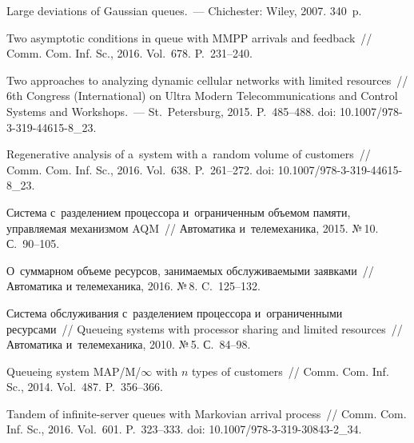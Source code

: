  \begin{multicols}{2}

\renewcommand{\bibname}{\protect\rmfamily Литература}

{\small\frenchspacing
{%
\begin{thebibliography}{99}

 Large deviations of Gaussian queues.~--- 
Chichester: Wiley, 2007. 340~p.

Two asymptotic conditions in queue with MMPP arrivals and feedback~// 
Comm. Com. Inf. Sc., 2016. Vol.~678. P.~231--240.

Two approaches to analyzing dynamic cellular networks with limited resources~//  
6th Congress (International)
on Ultra Modern Telecommunications and Control Systems and Workshops.~--- 
St.\ Petersburg, 2015. P.~485--488.
doi: 10.1007/978-3-319-44615-8\_23.

Regenerative analysis of a~system with a~random volume of customers~// 
Comm. Com. Inf. Sc., 2016. Vol.~638. P.~261--272.
doi: 10.1007/978-3-319-44615-8\_23.





Система с~разделением процессора и~ограниченным объемом памяти,
управ\-ля\-емая механизмом AQM~//
Автоматика и~телемеханика, 2015.
№\,10. С.~90--105.

О~суммарном объеме ресурсов, занимаемых обслуживаемыми заявками~// 
Автоматика и телемеханика, 2016. №\,8. C.~125--132.

Система обслуживания с~разделением процессора и~ограниченными ресурсами~//
Queueing systems with processor sharing and limited resources~// 
Автоматика и~телемеханика, 2010. №\,5. С.~84--98.

 Queueing system 
MAP/M/$\infty$ with $n$ types of customers~// 
Comm. Com. Inf. Sc., 2014. Vol.~487. P.~356--366.

Tandem of infinite-server queues with Markovian arrival process~// 
Comm. Com. Inf. Sc., 2016. Vol.~601. P.~323--333.
doi: 10.1007/978-3-319-30843-2\_34.


\end{thebibliography}}}
\end{multicols}
